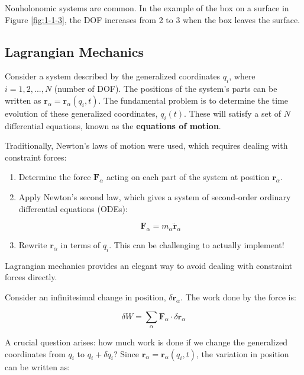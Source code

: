 Nonholonomic systems are common.  In the example of the box on a surface in Figure 
\ref{fig:1-1-3}, the DOF increases from 2 to 3 when the box leaves the surface.

\subsection{Lagrangian Mechanics}

Consider a system described by the generalized coordinates $q_i$, where $i = 1, 2, ..., N$ 
(number of DOF). The positions of the system's parts can be written as 
$\mathbf{r}_\alpha = \mathbf{r}_\alpha(q_i, t)$. The fundamental problem is to determine 
the time evolution of these generalized coordinates, $q_i(t)$. These will satisfy a set 
of $N$ differential equations, known as the \textbf{equations of motion}.

Traditionally, Newton's laws of motion were used, which requires dealing with constraint 
forces:

\begin{enumerate}
    \item Determine the force $\mathbf{F}_\alpha$ acting on each part of the system at 
    position $\mathbf{r}_\alpha$.
    \item Apply Newton's second law, which gives a system of second-order ordinary 
    differential equations (ODEs):

    \begin{equation}
        \mathbf{F}_\alpha = m_\alpha \ddot{\mathbf{r}}_\alpha
    \end{equation}

    \item  Rewrite $\mathbf{r}_\alpha$ in terms of $q_i$. This can be challenging to 
    actually implement!
\end{enumerate}

Lagrangian mechanics provides an elegant way to avoid dealing with constraint forces 
directly.

Consider an infinitesimal change in position, $\delta \mathbf{r}_\alpha$. The work done 
by the force is:

\begin{equation}
    \delta W = \sum_{\alpha} \mathbf{F}_\alpha \cdot \delta \mathbf{r}_\alpha
\end{equation}

A crucial question arises: how much work is done if we change the generalized coordinates 
from $q_i$ to $q_i + \delta q_i$? Since $\mathbf{r}_\alpha = \mathbf{r}_\alpha(q_i, t)$, 
the variation in position can be written as:

